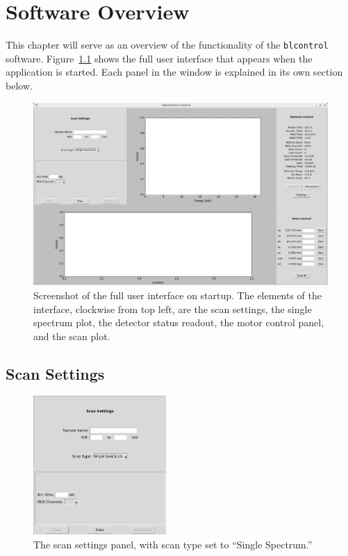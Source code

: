 \chapter{Software Overview\label{sec:software}}

This chapter will serve as an overview of the functionality of the
\texttt{blcontrol} software. Figure~\ref{fig:ui} shows the full user interface
that appears when the application is started. Each panel in the window is
explained in its own section below.


\begin{figure}
\centering \includegraphics[width=\textwidth]{fullui.png}
\caption{\label{fig:ui} Screenshot of the full user interface on startup. The
  elements of the interface, clockwise from top left, are the scan settings, the
  single spectrum plot, the detector status readout, the motor control panel,
  and the scan plot.}
\end{figure}

\section{Scan Settings}

\begin{figure}
\centering \includegraphics[width=0.45\textwidth]{scansettings.png}
\caption{\label{fig:scanset} The scan settings panel, with scan type set to
  ``Single Spectrum.''}
\end{figure}

